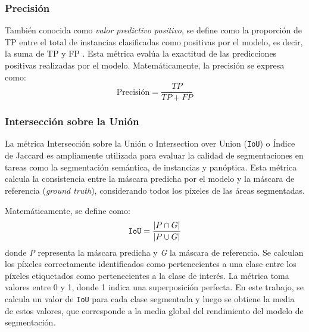 \subsubsection{Precisión}
También conocida como \textit{valor predictivo positivo}, se define como la proporción de TP entre el total de instancias clasificadas como positivas por el modelo, es decir, la suma de TP y FP \cite{Hossin2015precision}. Esta métrica evalúa la exactitud de las predicciones positivas realizadas por el modelo.
Matemáticamente, la precisión se expresa como: 
\begin{equation}
    \text{Precisión} = \frac{TP}{TP+FP}
\end{equation}
\subsubsection{Intersección sobre la Unión}
La métrica Intersección sobre la Unión o Intersection over Union (\texttt{IoU}) o Índice de Jaccard es ampliamente utilizada para evaluar la calidad de segmentaciones en tareas como la segmentación semántica, de instancias y panóptica. Esta métrica calcula la consistencia entre la máscara predicha por el modelo y la máscara de referencia (\textit{ground truth}), considerando todos los píxeles de las áreas segmentadas.

Matemáticamente, se define como:
\begin{equation}
    \text{\texttt{IoU}} = \frac{|P \cap G|}{|P \cup G|}
\end{equation}
donde \textit{P} representa la máscara predicha y \textit{G} la máscara de referencia. Se calculan los píxeles correctamente identificados como pertenecientes a una clase entre los píxeles etiquetados como pertenecientes a la clase de interés. La métrica toma valores entre 0 y 1, donde 1 indica una superposición perfecta. En este trabajo, se calcula un valor de \texttt{IoU} para cada clase segmentada y luego se obtiene la media de estos valores, que corresponde a la media global del rendimiento del modelo de segmentación. \cite{cheng2021iou}



